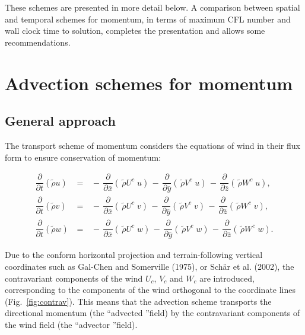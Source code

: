 These schemes are presented in more detail below. A comparison between spatial and temporal schemes for momentum, in terms of maximum CFL number and wall clock time to solution, completes the presentation and allows some recommendations.

\section{Advection schemes for momentum}

\subsection{General approach}
The transport scheme of momentum considers the equations of wind in their flux form to ensure conservation of momentum:

\begin{eqnarray}
\dfrac{\partial}{\partial t}(\tilde{\rho}u) \, &=&
 \, - \, \dfrac{\partial }{\partial \overline{x}} (\,\tilde{\rho} U^{c} \; u)
 \, - \, \dfrac{\partial }{\partial \overline{y}} (\,\tilde{\rho} V^{c} \; u)
 \, - \, \dfrac{\partial }{\partial \overline{z}} (\,\tilde{\rho} W^{c} \; u), 
\label{eq:mommesonh1}\\
\dfrac{\partial}{\partial t}(\tilde{\rho}v) \, &=&
 \, - \, \dfrac{\partial }{\partial \overline{x}} (\,\tilde{\rho} U^{c} \; v)
 \, - \, \dfrac{\partial }{\partial \overline{y}} (\,\tilde{\rho} V^{c} \; v)
 \, - \, \dfrac{\partial }{\partial \overline{z}} (\,\tilde{\rho} W^{c} \; v),
 \label{eq:mommesonh2}\\
\dfrac{\partial}{\partial t}(\tilde{\rho}w) \, &=&
 \, - \, \dfrac{\partial }{\partial \overline{x}} (\,\tilde{\rho} U^{c} \; w)
 \, - \, \dfrac{\partial }{\partial \overline{y}} (\,\tilde{\rho} V^{c} \; w)
 \, - \, \dfrac{\partial }{\partial \overline{z}} (\,\tilde{\rho} W^{c} \; w).
\label{eq:mommesonh3}
\end{eqnarray}

Due to the conform horizontal projection and terrain-following vertical coordinates such as Gal-Chen and Somerville (1975), or Sch\"ar et al. (2002), the contravariant components of the wind $U_c$, $V_c$ and $W_c$ are introduced, corresponding to the components of the wind orthogonal to the coordinate lines (Fig.~\ref{fig:contrav}). 
This means that the advection scheme transports the directional momentum (the \textquotedblleft advected \textquotedblright field) by the contravariant components of the wind field (the \textquotedblleft advector \textquotedblright field).

